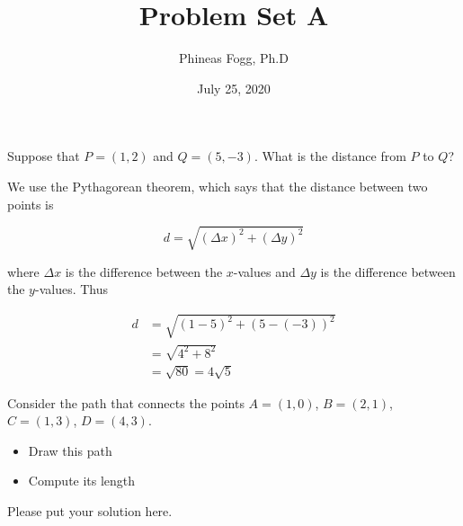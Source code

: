 \title{Problem Set A}
\author{Phineas Fogg, Ph.D}
\date{July 25, 2020}


\maketitle


\begin{problem}
Suppose that $P = (1,2)$ and $Q = (5,-3)$.  What is the distance from $P$ to $Q$?
\end{problem}

\begin{solution}
We use the Pythagorean theorem, which says that the distance between two points is

\begin{equation}
d = \sqrt{(\Delta x)^2 + (\Delta y)^2}
\end{equation}

where $\Delta x$ is the difference between the $x$-values and $\Delta y$ is the difference between the $y$-values.  Thus

\begin{align}
d &= \sqrt{(1 - 5)^2 + (5 - (-3))^2} \\
  &= \sqrt{4^2 + 8^2} \\
  &= \sqrt{80} = 4\sqrt{5}
\end{align}

\end{solution}

\begin{problem}
Consider the path that connects the points $A = (1,0)$,
$B = (2,1)$, $C = (1,3)$, $D = (4,3)$.

\medskip
\begin{itemize}
\item Draw this path
\item Compute its length
\end{itemize}
\end{problem}

\begin{solution}
Please put your solution here.
\end{solution}


